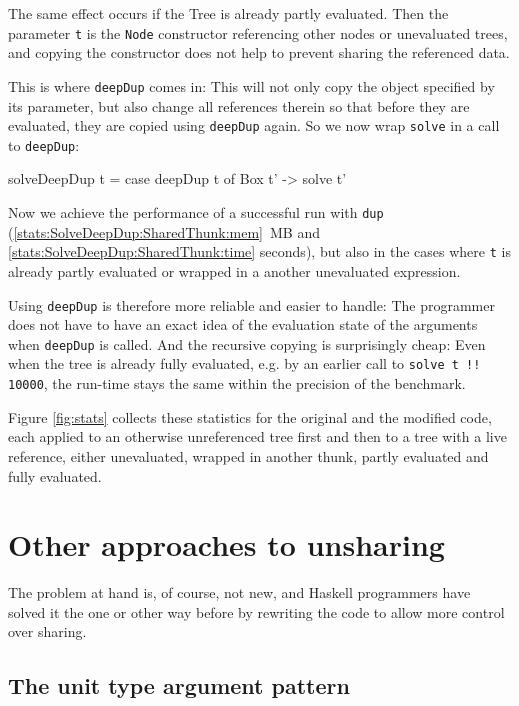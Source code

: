 \documentclass[preprint]{sigplanconf}
\theoremstyle{nonumberplain}
\newcommand{\li}{\lstinline[style=Haskell]}
\begin{document}
The same effect occurs if the Tree is already partly evaluated. Then the parameter \li-t- is the \li-Node- constructor referencing other nodes or unevaluated trees, and copying the constructor does not help to prevent sharing the referenced data.

This is where \li-deepDup- comes in: This will not only copy the object specified by its parameter, but also change all references therein so that before they are evaluated, they are copied using \li-deepDup- again. So we now wrap \li-solve- in a call to \li-deepDup-:
\begin{haskell}
solveDeepDup t = case deepDup t of Box t' -> solve t'
\end{haskell}
Now we achieve the performance of a successful run with \li-dup- (\ref{stats:SolveDeepDup:SharedThunk:mem}~MB and \ref{stats:SolveDeepDup:SharedThunk:time} seconds), but also in the cases where \li-t- is already partly evaluated or wrapped in a another unevaluated expression.

Using \li-deepDup- is therefore more reliable and easier to handle: The programmer does not have to have an exact idea of the evaluation state of the arguments when \li-deepDup- is called. And the recursive copying is surprisingly cheap: Even when the tree is already fully evaluated, e.g. by an earlier call to \li-solve t !! 10000-, the run-time stays the same within the precision of the benchmark.

Figure \ref{fig:stats} collects these statistics for the original and the modified code, each applied to an otherwise unreferenced tree first and then to a tree with a live reference, either unevaluated, wrapped in another thunk, partly evaluated and fully evaluated.

\section{Other approaches to unsharing}
\label{sec:sourcetrans}

The problem at hand is, of course, not new, and Haskell programmers have solved it the one or other way before by rewriting the code to allow more control over sharing.

\subsection{The unit type argument pattern}
\end{document}
